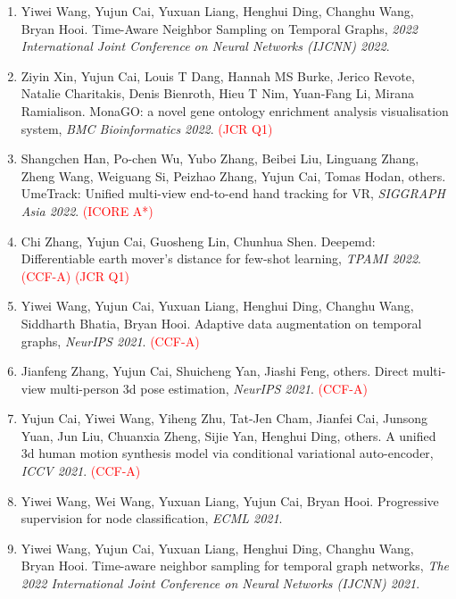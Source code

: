\begin{enumerate}
\item Yiwei Wang, Yujun Cai, Yuxuan Liang, Henghui Ding, Changhu Wang, Bryan Hooi. Time-Aware Neighbor Sampling on Temporal Graphs, \textit{2022 International Joint Conference on Neural Networks (IJCNN) 2022}.

\item Ziyin Xin, Yujun Cai, Louis T Dang, Hannah MS Burke, Jerico Revote, Natalie Charitakis, Denis Bienroth, Hieu T Nim, Yuan-Fang Li, Mirana Ramialison. MonaGO: a novel gene ontology enrichment analysis visualisation system, \textit{BMC Bioinformatics 2022}. \textcolor{red}{(JCR Q1)}

\item Shangchen Han, Po-chen Wu, Yubo Zhang, Beibei Liu, Linguang Zhang, Zheng Wang, Weiguang Si, Peizhao Zhang, Yujun Cai, Tomas Hodan, others. UmeTrack: Unified multi-view end-to-end hand tracking for VR, \textit{SIGGRAPH Asia 2022}. \textcolor{red}{(ICORE A*)}

\item Chi Zhang, Yujun Cai, Guosheng Lin, Chunhua Shen. Deepemd: Differentiable earth mover's distance for few-shot learning, \textit{TPAMI 2022}. \textcolor{red}{(CCF-A)} \textcolor{red}{(JCR Q1)}

\item Yiwei Wang, Yujun Cai, Yuxuan Liang, Henghui Ding, Changhu Wang, Siddharth Bhatia, Bryan Hooi. Adaptive data augmentation on temporal graphs, \textit{NeurIPS 2021}. \textcolor{red}{(CCF-A)}

\item Jianfeng Zhang, Yujun Cai, Shuicheng Yan, Jiashi Feng, others. Direct multi-view multi-person 3d pose estimation, \textit{NeurIPS 2021}. \textcolor{red}{(CCF-A)}

\item Yujun Cai, Yiwei Wang, Yiheng Zhu, Tat-Jen Cham, Jianfei Cai, Junsong Yuan, Jun Liu, Chuanxia Zheng, Sijie Yan, Henghui Ding, others. A unified 3d human motion synthesis model via conditional variational auto-encoder, \textit{ICCV 2021}. \textcolor{red}{(CCF-A)}

\item Yiwei Wang, Wei Wang, Yuxuan Liang, Yujun Cai, Bryan Hooi. Progressive supervision for node classification, \textit{ECML 2021}.

\item Yiwei Wang, Yujun Cai, Yuxuan Liang, Henghui Ding, Changhu Wang, Bryan Hooi. Time-aware neighbor sampling for temporal graph networks, \textit{The 2022 International Joint Conference on Neural Networks (IJCNN) 2021}.


\end{enumerate}
